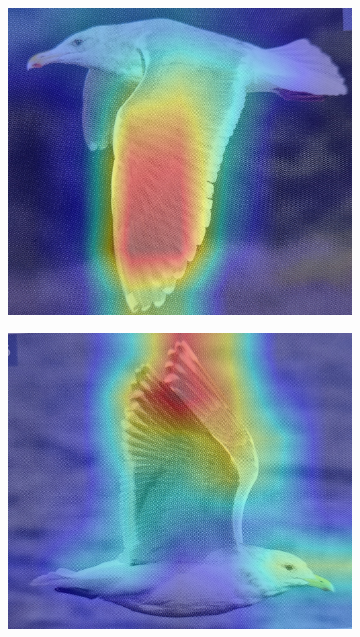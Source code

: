 \documentclass[a4paper,12pt]{report}
\begin{document}
\begin{figure}[htbp]
    \vspace{0.3em}
    
    \begin{subfigure}[b]{0.22\textwidth}
        \includegraphics[width=\textwidth]{images/interpretability/vgg/bird6.jpg}
        \caption{}
    \end{subfigure}
    \hfill
    \begin{subfigure}[b]{0.22\textwidth}
        \includegraphics[width=\textwidth]{images/interpretability/vgg/bird7.jpg}

\end{subfigure}
\end{figure}
\end{document}
